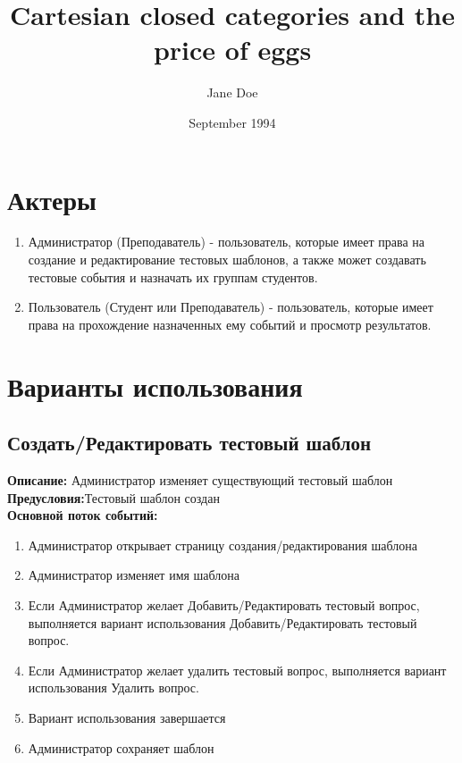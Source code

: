 \documentclass{article}
\title{Cartesian closed categories and the price of eggs}
\author{Jane Doe}
\date{September 1994}
\begin{document}
    \maketitle
    \section{Актеры}
    \begin{enumerate}
        \item Администратор (Преподаватель) - пользователь, которые имеет права на создание и редактирование тестовых шаблонов, а также может создавать тестовые события и назначать их группам студентов.
        \item Пользователь (Студент или Преподаватель) - пользователь, которые имеет права на прохождение назначенных ему событий и просмотр результатов.
    \end{enumerate}
    

    \section{Варианты использования}
    \subsection{Создать/Редактировать тестовый шаблон}
    \textbf{Описание:} Администратор изменяет существующий тестовый шаблон\\
    \textbf{Предусловия:}Тестовый шаблон создан\\
    \textbf{Основной поток событий:}
    \begin{enumerate}
        \item Администратор открывает страницу создания/редактирования шаблона
        \item Администратор изменяет имя шаблона
        \item Если Администратор желает Добавить/Редактировать тестовый вопрос, выполняется вариант использования Добавить/Редактировать тестовый вопрос.
        \item Если Администратор желает удалить тестовый вопрос, выполняется вариант использования Удалить вопрос.
        \item Вариант использования завершается
        \item Администратор сохраняет шаблон
    \end{enumerate} 
    
\end{document}
